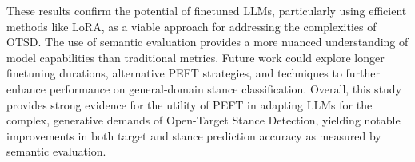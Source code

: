 \documentclass[twocolumn,11pt,letterpaper]{article}
\begin{document}
These results confirm the potential of finetuned LLMs, particularly using efficient methods like LoRA, as a viable approach for addressing the complexities of OTSD. The use of semantic evaluation provides a more nuanced understanding of model capabilities than traditional metrics. Future work could explore longer finetuning durations, alternative PEFT strategies, and techniques to further enhance performance on general-domain stance classification. Overall, this study provides strong evidence for the utility of PEFT in adapting LLMs for the complex, generative demands of Open-Target Stance Detection, yielding notable improvements in both target and stance prediction accuracy as measured by semantic evaluation.

\end{document}
